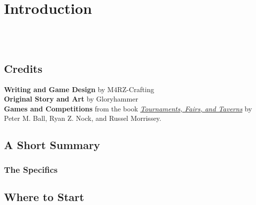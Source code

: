 \chapter*{Introduction}

{\entryfont \ \\\\}

\section*{Credits}
\textbf{Writing and Game Design} by M4RZ-Crafting\\
\textbf{Original Story and Art} by Gloryhammer\\
\textbf{Games and Competitions} from the book \href{https://marderz.store/rpgbooks/Dungeons%20and%20dragons%20mega%20book%20pack/EN%20publishing/Tournaments%2C%20Fairs%2C%20And%20Taverns.pdf}{\textit{Tournaments, Fairs, and Taverns}} by Peter M. Ball, Ryan Z. Nock, and Russel Morrissey.

\section*{A Short Summary}
{\entryfont \noindent }

\subsection*{The Specifics}
{\entryfont \noindent }

\section*{Where to Start}
{\entryfont \noindent }